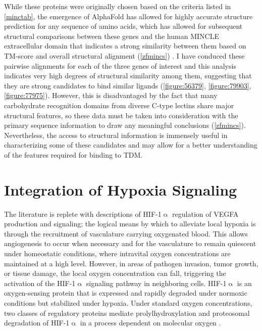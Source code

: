 While these proteins were originally chosen based on the criteria listed in \autoref{minctab}, the emergence of AlphaFold has allowed for highly accurate structure prediction for any sequence of amino acids, which has allowed for subsequent structural comparisons between these genes and the human MINCLE extracellular domain that indicates a strong similarity between them based on TM-score and overall structural alignment (\autoref{zfmincs}) \citep{Jumper2021}. I have conduced these pairwise alignments for each of the three genes of interest and this analysis indicates very high degrees of structural similarity among them, suggesting that they are strong candidates to bind similar ligands (\autoref{figure:56379}, \autoref{figure:79903}, \autoref{figure:77975}). However, this is disadvantaged by the fact that many carbohydrate recognition domains from diverse C-type lectins share major structural features, so these data must be taken into consideration with the primary sequence information to draw any meaningful conclusions (\autoref{zfmincs}). Nevertheless, the access to structural information is immensely useful in characterizing some of these candidates and may allow for a better understanding of the features required for binding to TDM.

\section{Integration of Hypoxia Signaling}\label{hypoxia}

The literature is replete with descriptions of HIF\hyp{}1$\upalpha$ regulation of VEGFA production and signaling; the logical means by which to alleviate local hypoxia is through the recruitment of vasculature carrying oxygenated blood. This allows angiogenesis to occur when necessary and for the vasculature to remain quiescent under homeostatic conditions, where intravital oxygen concentrations are maintained at a high level. However, in areas of pathogen invasion, tumor growth, or tissue damage, the local oxygen concentration can fall, triggering the activation of the HIF\hyp{}1$\upalpha$ signaling pathway in neighboring cells. HIF\hyp{}1$\upalpha$ is an oxygen\hyp{}sensing protein that is expressed and rapidly degraded under normoxic conditions but stabilized under hypoxia. Under standard oxygen concentrations, two classes of regulatory proteins mediate prolylhydroxylation and proteosomal degradation of HIF\hyp{}1$\upalpha$ in a process dependent on molecular oxygen \citep{Corcoran2016, Hong2004, Masoud2015}.

